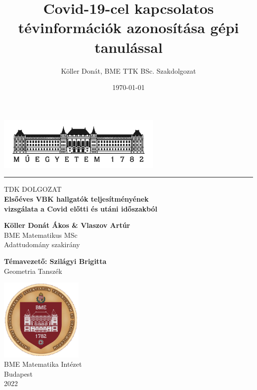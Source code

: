 \documentclass[12pt]{article}
\title{Covid-19-cel kapcsolatos tévinformációk azonosítása gépi tanulással}
\author{Köller Donát, BME TTK BSc. Szakdolgozat}
\date{\today}
\begin{document}
\begin{titlepage}
\begin{center}
       \includegraphics[width=0.6\textwidth]{kepek/bme_logo_kicsi}
       \rule{15cm}{0.1mm}
       
       \vspace*{0.5cm}
       
       
       
       \huge{TDK DOLGOZAT} \\
       
       

       \vspace{1cm}
        \Large{\textbf{Elsőéves VBK hallgatók teljesítményének}} \\
        \Large{\textbf{vizsgálata a Covid előtti és utáni időszakból}} 
        
        \vspace{1.8cm}
        
        \large{\textbf{Köller Donát Ákos \& Vlaszov Artúr}}\\
       \large{BME Matematikus MSc} \\
       \large{Adattudomány szakirány} \\
       
       
       \vspace{1.8cm}
               

      \large{\textbf{Témavezető: Szilágyi Brigitta}}\\
      \large{Geometria Tanszék}
            
       
            
       \vfill
     
       \includegraphics[width=0.3\textwidth]{kepek/bme_cimer}\\
       \large{BME Matematika Intézet} \\
       \large{Budapest} \\
       \large{2022}
            

            
   \end{center}
\end{titlepage}
\newpage
\end{document}
